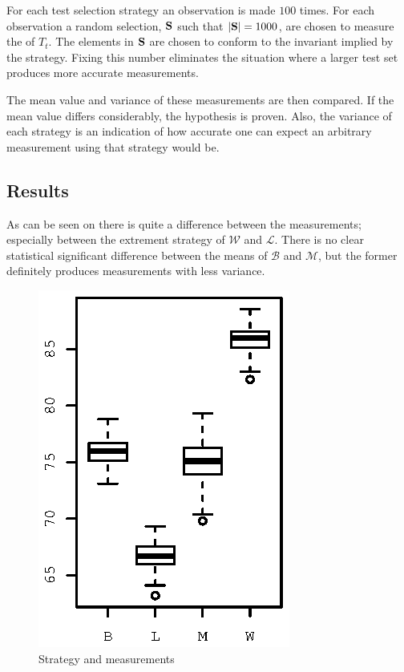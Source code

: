 For each test selection strategy an observation is made $100$ times.  For each observation a random selection, ${\bf S}$ such that $|{\bf S}| = 1000$, are chosen to measure the  of $T_t$. The elements in ${\bf S}$ are chosen to conform to the invariant implied by the strategy.  Fixing this number eliminates the situation where a larger test set produces more accurate measurements.

The mean value and variance of these measurements are then compared.   If the mean value differs considerably, the hypothesis is proven.  Also, the variance of each strategy is an indication of how accurate one can expect an arbitrary measurement using that strategy would be.  
      
\subsection{Results}
As can be seen on  there is quite a difference between the measurements; especially between the extrement strategy of $\mathcal W$ and $\mathcal L$.  There is no clear statistical significant difference between the means of $\mathcal B$ and $\mathcal M$, but the former definitely produces measurements with less variance.   
\begin{figure} 
\center
\includegraphics{artifacts/c4-025box.eps}
\caption{Strategy and measurements}
\label{fig:c4-025}
\end{figure}

